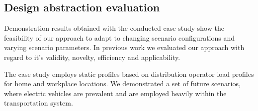 \subsection{Design abstraction evaluation}
\label{discussion}

Demonstration results obtained with the conducted case study show the feasibility of our approach to adapt to changing scenario configurations and varying scenario parameters. In previous work \cite{ascher2015integrated} we evaluated our approach with regard to it's validity, novelty, efficiency and applicability. 

The case study employs static profiles based on distribution operator load profiles for home and workplace locations. We demonstrated a set of future scenarios, where electric vehicles are prevalent and are employed heavily within the transportation system.

